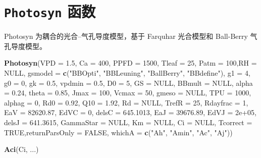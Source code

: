 \documentclass[
]{krantz}
\makeatletter
\newenvironment{Shaded}{\begin{snugshade}}{\end{snugshade}}
\newcommand{\DataTypeTok}[1]{\textcolor[rgb]{0.13,0.29,0.53}{#1}}
\newcommand{\DecValTok}[1]{\textcolor[rgb]{0.00,0.00,0.81}{#1}}
\newcommand{\FloatTok}[1]{\textcolor[rgb]{0.00,0.00,0.81}{#1}}
\newcommand{\KeywordTok}[1]{\textcolor[rgb]{0.13,0.29,0.53}{\textbf{#1}}}
\newcommand{\NormalTok}[1]{#1}
\newcommand{\OtherTok}[1]{\textcolor[rgb]{0.56,0.35,0.01}{#1}}
\newcommand{\StringTok}[1]{\textcolor[rgb]{0.31,0.60,0.02}{#1}}
\newenvironment{kframe}{%
\medskip{}
\setlength{\fboxsep}{.8em}
 \def\at@end@of@kframe{}%
 \ifinner\ifhmode%
  \def\at@end@of@kframe{\end{minipage}}%
  \begin{minipage}{\columnwidth}%
 \fi\fi%
 \def\FrameCommand##1{\hskip\@totalleftmargin \hskip-\fboxsep
 \colorbox{shadecolor}{##1}\hskip-\fboxsep
     \hskip-\linewidth \hskip-\@totalleftmargin \hskip\columnwidth}%
 \MakeFramed {\advance\hsize-\width
   \@totalleftmargin\z@ \linewidth\hsize
   \@setminipage}}%
 {\par\unskip\endMakeFramed%
 \at@end@of@kframe}
\renewenvironment{Shaded}{\begin{kframe}}{\end{kframe}}
\makeatother
\begin{document}
\hypertarget{photosyn}{%
\section{\texorpdfstring{\texttt{Photosyn} 函数}{Photosyn 函数}}\label{photosyn}}

Photosyn 为耦合的光合--气孔导度模型，基于 Farquhar 光合模型和 Ball-Berry 气孔导度模型。

\begin{Shaded}
\begin{Highlighting}[]
\KeywordTok{Photosyn}\NormalTok{(}\DataTypeTok{VPD =} \FloatTok{1.5}\NormalTok{, }\DataTypeTok{Ca =} \DecValTok{400}\NormalTok{, }\DataTypeTok{PPFD =} \DecValTok{1500}\NormalTok{,}
         \DataTypeTok{Tleaf =} \DecValTok{25}\NormalTok{, }\DataTypeTok{Patm =} \DecValTok{100}\NormalTok{,}\DataTypeTok{RH =} \OtherTok{NULL}\NormalTok{,}
         \DataTypeTok{gsmodel =} \KeywordTok{c}\NormalTok{(}\StringTok{"BBOpti"}\NormalTok{, }\StringTok{"BBLeuning"}\NormalTok{, }
                     \StringTok{"BallBerry"}\NormalTok{, }\StringTok{"BBdefine"}\NormalTok{),}
         \DataTypeTok{g1 =} \DecValTok{4}\NormalTok{, }\DataTypeTok{g0 =} \DecValTok{0}\NormalTok{, }\DataTypeTok{gk =} \FloatTok{0.5}\NormalTok{, }\DataTypeTok{vpdmin =} \FloatTok{0.5}\NormalTok{,}
         \DataTypeTok{D0 =} \DecValTok{5}\NormalTok{, }\DataTypeTok{GS =} \OtherTok{NULL}\NormalTok{, }\DataTypeTok{BBmult =} \OtherTok{NULL}\NormalTok{, }
         \DataTypeTok{alpha =} \FloatTok{0.24}\NormalTok{, }\DataTypeTok{theta =} \FloatTok{0.85}\NormalTok{, }\DataTypeTok{Jmax =} \DecValTok{100}\NormalTok{,}
         \DataTypeTok{Vcmax =} \DecValTok{50}\NormalTok{, }\DataTypeTok{gmeso =} \OtherTok{NULL}\NormalTok{, }\DataTypeTok{TPU =} \DecValTok{1000}\NormalTok{, }
         \DataTypeTok{alphag =} \DecValTok{0}\NormalTok{, }\DataTypeTok{Rd0 =} \FloatTok{0.92}\NormalTok{, }\DataTypeTok{Q10 =} \FloatTok{1.92}\NormalTok{,}
         \DataTypeTok{Rd =} \OtherTok{NULL}\NormalTok{, }\DataTypeTok{TrefR =} \DecValTok{25}\NormalTok{, }\DataTypeTok{Rdayfrac =} \DecValTok{1}\NormalTok{, }
         \DataTypeTok{EaV =} \FloatTok{82620.87}\NormalTok{, }\DataTypeTok{EdVC =} \DecValTok{0}\NormalTok{, }\DataTypeTok{delsC =} \FloatTok{645.1013}\NormalTok{, }
         \DataTypeTok{EaJ =} \FloatTok{39676.89}\NormalTok{, }\DataTypeTok{EdVJ =} \FloatTok{2e+05}\NormalTok{, }\DataTypeTok{delsJ =} \FloatTok{641.3615}\NormalTok{,}
         \DataTypeTok{GammaStar =} \OtherTok{NULL}\NormalTok{, }\DataTypeTok{Km =} \OtherTok{NULL}\NormalTok{, }\DataTypeTok{Ci =} \OtherTok{NULL}\NormalTok{, }
         \DataTypeTok{Tcorrect =} \OtherTok{TRUE}\NormalTok{,}\DataTypeTok{returnParsOnly =} \OtherTok{FALSE}\NormalTok{,}
         \DataTypeTok{whichA =} \KeywordTok{c}\NormalTok{(}\StringTok{"Ah"}\NormalTok{, }\StringTok{"Amin"}\NormalTok{, }\StringTok{"Ac"}\NormalTok{, }\StringTok{"Aj"}\NormalTok{))}

\KeywordTok{Aci}\NormalTok{(Ci, ...)}
\end{Highlighting}
\end{Shaded}
\end{document}

